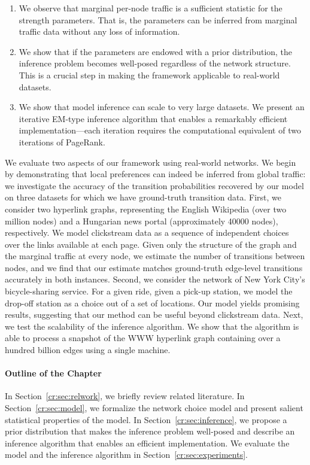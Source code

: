 \begin{enumerate}
\item We observe that marginal per-node traffic is a sufficient statistic for the strength parameters.
That is, the parameters can be inferred from marginal traffic data without any loss of information.

\item We show that if the parameters are endowed with a prior distribution, the inference problem becomes well-posed regardless of the network structure.
This is a crucial step in making the framework applicable to real-world datasets.

\item We show that model inference can scale to very large datasets.
We present an iterative EM-type inference algorithm that enables a remarkably efficient implementation---each iteration requires the computational equivalent of two iterations of PageRank.
\end{enumerate}


We evaluate two aspects of our framework using real-world networks.
We begin by demonstrating that local preferences can indeed be inferred from global traffic: we investigate the accuracy of the transition probabilities recovered by our model on three datasets for which we have ground-truth transition data.
First, we consider two hyperlink graphs, representing the English Wikipedia (over two million nodes) and a Hungarian news portal (approximately \num{40000} nodes), respectively.
We model clickstream data as a sequence of independent choices over the links available at each page.
Given only the structure of the graph and the marginal traffic at every node, we estimate the number of transitions between nodes, and we find that our estimate matches ground-truth edge-level transitions accurately in both instances.
Second, we consider the network of New York City's bicycle-sharing service.
For a given ride, given a pick-up station, we model the drop-off station as a choice out of a set of locations.
Our model yields promising results, suggesting that our method can be useful beyond clickstream data.
Next, we test the scalability of the inference algorithm.
We show that the algorithm is able to process a snapshot of the WWW hyperlink graph containing over a hundred billion edges using a single machine.

\paragraph{Outline of the Chapter}
In Section~\ref{cr:sec:relwork}, we briefly review related literature.
In Section~\ref{cr:sec:model}, we formalize the network choice model and present salient statistical properties of the model.
In Section~\ref{cr:sec:inference}, we propose a prior distribution that makes the inference problem well-posed and describe an inference algorithm that enables an efficient implementation.
We evaluate the model and the inference algorithm in Section~\ref{cr:sec:experiments}.
